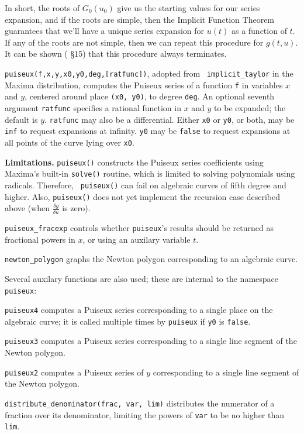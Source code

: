 In short, the roots of $G_0(u_0)$ give us the starting values for our series expansion,
and if the roots are simple, then the Implicit Function Theorem guarantees that we'll
have a unique series expansion for $u(t)$ as a function of $t$.  If any of the roots
are not simple, then we can repeat this procedure for $g(t,u)$.  It can be shown
(\cite{bliss} \S 15) that this procedure always terminates.

\vfill\eject

{\tt puiseux(f,x,y,x0,y0,deg,[ratfunc])}, adopted from {\tt
implicit_taylor} in the Maxima distribution, computes the Puiseux
series of a function {\tt f} in variables $x$ and $y$, centered around
place {\tt (x0, y0)}, to degree {\tt deg}.  An optional seventh
argument {\tt ratfunc} specifies a rational function in $x$ and $y$ to
be expanded; the default is $y$.  {\tt ratfunc} may also be a
differential.  Either {\tt x0} or {\tt y0}, or both, may be {\tt inf}
to request expansions at infinity.  {\tt y0} may be {\tt false}
to request expansions at all points of the curve lying over {\tt x0}.

{\bf Limitations.}  {\tt puiseux()} constructs the Puiseux series
coefficients using Maxima's built-in {\tt solve()} routine, which is
limited to solving polynomials using radicals.  Therefore, {\tt
puiseux()} can fail on algebraic curves of fifth degree and higher.
Also, {\tt puiseux()} does not yet implement the recursion case
described above (when $\frac{\delta g}{\delta u}$ is zero).

{\tt puiseux_fracexp} controls whether {\tt puiseux}'s results
should be returned as fractional powers in $x$, or using
an auxilary variable $t$.

{\tt newton_polygon} graphs the Newton polygon corresponding to
an algebraic curve.

Several auxilary functions are also used; these are internal to
the namespace {\tt puiseux}:

{\tt puiseux4} computes a Puiseux series corresponding to a single
place on the algebraic curve; it is called multiple times by
{\tt puiseux} if {\tt y0} is {\tt false}.

{\tt puiseux3} computes a Puiseux series corresponding to a single
line segment of the Newton polygon.

{\tt puiseux2} computes a Puiseux series of $y$ corresponding to a
single line segment of the Newton polygon.

{\tt distribute_denominator(frac, var, lim)} distributes the numerator
of a fraction over its denominator, limiting the powers of {\tt var}
to be no higher than {\tt lim}.

